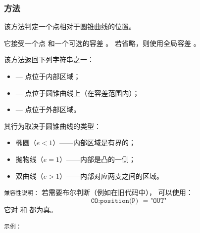 \subsubsection{方法 }
\label{ssub:method_conic_position}

该方法判定一个点相对于圆锥曲线的位置。

\medskip

它接受一个点  和一个可选的容差 。
若省略，则使用全局容差 。

\medskip

该方法返回下列字符串之一：
\begin{itemize}
  \item {}  — 点位于内部区域；
  \item {}  — 点位于圆锥曲线上（在容差范围内）；
  \item {} — 点位于外部区域。
\end{itemize}

\medskip

其行为取决于圆锥曲线的类型：
\begin{itemize}
  \item 椭圆（\(e < 1\)）——内部区域是有界的；
  \item 抛物线（\(e = 1\)）——内部是凸的一侧；
  \item 双曲线（\(e > 1\)）——内部对应两支之间的区域。
\end{itemize}

\medskip

\noindent\texttt{兼容性说明：}
若需要布尔判断（例如在旧代码中），
可以使用：
\[
\texttt{CO:position(P) ~= "OUT"}
\]
它对  和  都为真。

\vspace{1em}

\texttt{示例：}


